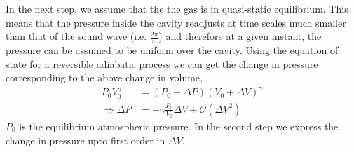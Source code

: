 \documentclass[a4paper,10pt]{article}
\begin{document}
In the next step, we assume that the the gas is in quasi-static equilibrium. This means that the pressure inside the cavity readjusts
at time scales much smaller than that of the sound wave (i.e. $\frac{2\pi}{\omega}$) and therefore at
a given instant, the pressure can be assumed to be uniform over the cavity. Using the equation of state for a reversible adiabatic process we can
get the change in pressure corresponding to the above change in volume,
\begin{align}
 P_0V_0^\gamma&=(P_0+\Delta P)(V_0+\Delta V)^\gamma\nonumber\\
 \Rightarrow \Delta P&=-\gamma\frac{P_0}{V_0}\Delta V+\mathcal{O}(\Delta V^2)
\end{align}
$P_0$ is the equilibrium atmospheric pressure. In the second step we express the change
in pressure upto first order in $\Delta V$.
\end{document}
